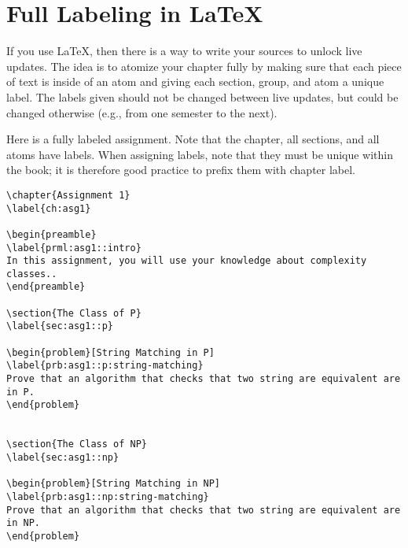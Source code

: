 \section{Full Labeling in LaTeX}
\label{sec:publish::full-labeling}

\begin{gram}
If you use LaTeX, then there is a way to write your sources to unlock live updates.
%
The idea is to atomize your chapter fully by making sure that each piece of text is inside of an atom and giving each section, group, and atom a unique label.
%
The labels given should not be changed between live updates, but could be changed otherwise (e.g., from one semester to the next).
%
\end{gram}


\begin{example}

Here is a fully labeled assignment.  Note that the chapter, all sections, and all atoms have labels.  When assigning labels, note that they must be unique within the book; it is therefore good practice to prefix them with chapter label.
%

\begin{lstlisting}
\chapter{Assignment 1}
\label{ch:asg1}

\begin{preamble}
\label{prml:asg1::intro}
In this assignment, you will use your knowledge about complexity classes..
\end{preamble}

\section{The Class of P}
\label{sec:asg1::p}

\begin{problem}[String Matching in P]
\label{prb:asg1::p:string-matching}
Prove that an algorithm that checks that two string are equivalent are in P.
\end{problem}


\section{The Class of NP}
\label{sec:asg1::np}

\begin{problem}[String Matching in NP]
\label{prb:asg1::np:string-matching}
Prove that an algorithm that checks that two string are equivalent are in NP.
\end{problem}



\end{lstlisting}
\end{example}
